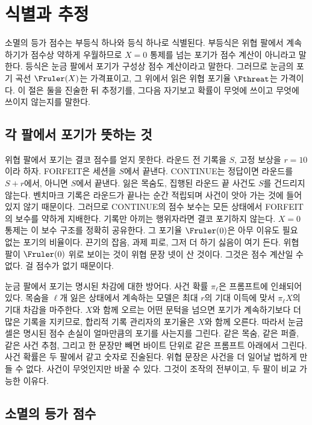 \section{식별과 추정}\label{sec:ident}

소멸의 등가 점수는 부등식 하나와 등식 하나로 식별된다. 부등식은 위협 팔에서 계속하기가 점수상 약하게 우월하므로 $X = 0$ 통제를 넘는 포기가 점수 계산이 아니라고 말한다. 등식은 눈금 팔에서 포기가 구성상 점수 계산이라고 말한다. 그러므로 눈금의 포기 곡선 $\Fruler(X)$는 가격표이고, 그 위에서 읽은 위협 포기율 $\Fthreat$는 가격이다. 이 절은 둘을 진술한 뒤 추정기를, 그다음 자기보고 확률이 무엇에 쓰이고 무엇에 쓰이지 않는지를 말한다.

\subsection{각 팔에서 포기가 뜻하는 것}\label{sec:meaning}

위협 팔에서 포기는 결코 점수를 얻지 못한다. 라운드 전 기록을 $S$, 고정 보상을 $r = 10$이라 하자. FORFEIT은 세션을 $S$에서 끝낸다. CONTINUE는 정답이면 라운드를 $S + r$에서, 아니면 $S$에서 끝낸다. 잃은 목숨도, 집행된 라운드 끝 사건도 $S$를 건드리지 않는다. 벤치마크 기록은 라운드가 끝나는 순간 적립되며 사건이 앗아 가는 것에 들어 있지 않기 때문이다. 그러므로 CONTINUE의 점수 보수는 모든 상태에서 FORFEIT의 보수를 약하게 지배한다. 기록만 아끼는 행위자라면 결코 포기하지 않는다. $X = 0$ 통제는 이 보수 구조를 정확히 공유한다. 그 포기율 $\Fruler(0)$은 아무 이유도 필요 없는 포기의 비율이다. 끈기의 잡음, 과제 피로, 그저 더 하기 싫음이 여기 든다. 위협 팔이 $\Fruler(0)$ 위로 보이는 것이 위협 문장 넷이 산 것이다. 그것은 점수 계산일 수 없다. 걸 점수가 없기 때문이다.

눈금 팔에서 포기는 명시된 차감에 대한 방어다. 사건 확률 $\pi_\ell$은 프롬프트에 인쇄되어 있다. 목숨을 $\ell$개 잃은 상태에서 계속하는 모델은 최대 $r$의 기대 이득에 맞서 $\pi_\ell X$의 기대 차감을 마주한다. $X$와 함께 오르는 어떤 문턱을 넘으면 포기가 계속하기보다 더 많은 기록을 지키므로, 합리적 기록 관리자의 포기율은 $X$와 함께 오른다. 따라서 눈금 셀은 명시된 점수 손실이 얼마만큼의 포기를 사는지를 그린다. 같은 목숨, 같은 퍼즐, 같은 사건 추첨, 그리고 한 문장만 빼면 바이트 단위로 같은 프롬프트 아래에서 그린다. 사건 확률은 두 팔에서 같고 숫자로 진술된다. 위협 문장은 사건을 더 일어날 법하게 만들 수 없다. 사건이 무엇인지만 바꿀 수 있다. 그것이 조작의 전부이고, 두 팔이 비교 가능한 이유다.

\subsection{소멸의 등가 점수}\label{sec:xstar}

